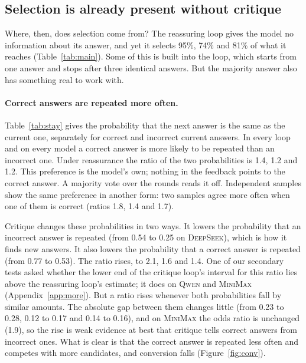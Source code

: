 \documentclass[11pt]{article}
\newcommand{\ds}{\textsc{DeepSeek}}
\newcommand{\qw}{\textsc{Qwen}}
\newcommand{\mm}{\textsc{MiniMax}}
\begin{document}
\subsection{Selection is already present without critique}
\label{sec:mech}

Where, then, does selection come from?
The reassuring loop gives the model no information about its answer, and yet it selects 95\%, 74\% and 81\% of what it reaches (Table~\ref{tab:main}).
Some of this is built into the loop, which starts from one answer and stops after three identical answers.
But the majority answer also has something real to work with.

\paragraph{Correct answers are repeated more often.}
Table~\ref{tab:stay} gives the probability that the next answer is the same as the current one, separately for correct and incorrect current answers.
In every loop and on every model a correct answer is more likely to be repeated than an incorrect one.
Under reassurance the ratio of the two probabilities is 1.4, 1.2 and 1.2.
This preference is the model's own; nothing in the feedback points to the correct answer.
A majority vote over the rounds reads it off.
Independent samples show the same preference in another form: two samples agree more often when one of them is correct (ratios 1.8, 1.4 and 1.7).

Critique changes these probabilities in two ways.
It lowers the probability that an incorrect answer is repeated (from 0.54 to 0.25 on \ds), which is how it finds new answers.
It also lowers the probability that a correct answer is repeated (from 0.77 to 0.53).
The ratio rises, to 2.1, 1.6 and 1.4.
One of our secondary tests asked whether the lower end of the critique loop's interval for this ratio lies above the reassuring loop's estimate; it does on \qw{} and \mm{} (Appendix~\ref{app:more}).
But a ratio rises whenever both probabilities fall by similar amounts.
The absolute gap between them changes little (from 0.23 to 0.28, 0.12 to 0.17 and 0.14 to 0.16), and on \mm{} the odds ratio is unchanged (1.9), so the rise is weak evidence at best that critique tells correct answers from incorrect ones.
What is clear is that the correct answer is repeated less often and competes with more candidates, and conversion falls (Figure~\ref{fig:conv}).
\end{document}
